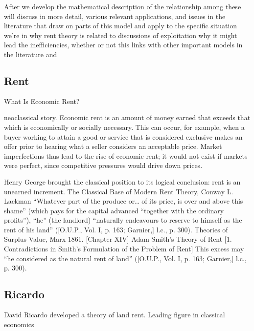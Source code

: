 After we develop the mathematical description of the relationship among these will discuss in more detail, various relevant applications, and issues in the literature that draw on parts of this model and apply to the specific situation we're in why rent theory is related to discussions of exploitation why it might lead the inefficiencies, whether or not this links with other important models in the literature and 


\color{black}

\subsection{Rent}

 What Is Economic Rent?






neoclassical story.
Economic rent is an amount of money earned that exceeds that which is economically or socially necessary. This can occur, for example, when a buyer working to attain a good or service that is considered exclusive makes an offer prior to hearing what a seller considers an acceptable price. Market imperfections thus lead to the rise of economic rent; it would not exist if markets were perfect, since competitive pressures would drive down prices. 



Henry George brought the classical position to its logical conclusion: rent is an unearned increment. The Classical Base of Modern Rent Theory, Conway L. Lackman
“Whatever part of the produce or… of its price, is over and above this shame” (which pays for the capital advanced “together with the ordinary profits”), “he” (the landlord) “naturally endeavours to reserve to himself as the rent of his land” ([O.U.P., Vol. I, p. 163; Garnier,]  
l.c., p. 300). Theories of Surplus Value, Marx 1861. [Chapter XIV]  
 Adam Smith’s Theory of Rent [1.  Contradictions in Smith’s Formulation of the Problem of Rent]
This excess may “he considered as the natural rent of land” ([O.U.P., Vol. I, p. 163; Garnier,]
l.c., p. 300).


 \subsection{Ricardo}
 
 David Ricardo developed a theory of land rent.
Leading figure in classical economics



